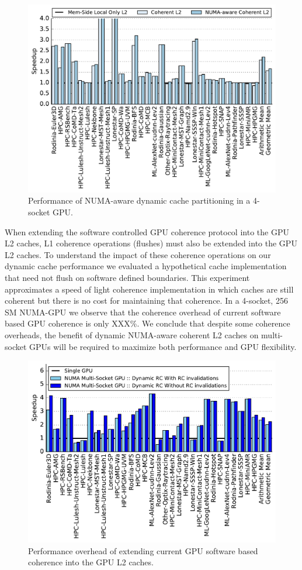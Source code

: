 \begin{figure}[t]
    \centering
    \includegraphics[width=1.0\columnwidth]{figures/plot_dynamic_cache_WB.pdf}
    \caption{Performance of NUMA-aware dynamic cache partitioning in a 4-socket GPU.}
    \label{fig:dynamiccaching}
\end{figure}

 When extending the software controlled GPU coherence protocol into the GPU L2 caches,
L1 coherence operations (flushes) must also be extended into the GPU L2 caches.  To understand
the impact of these coherence operations on our dynamic cache performance we evaluated a hypothetical
cache implementation that need not flush on software defined boundaries.  This experiment
approximates a speed of light coherence implementation in which caches are still coherent but
there is no cost for maintaining that coherence.  In a 4-socket, 256 SM NUMA-GPU we observe
that the coherence overhead of current software based GPU coherence is only XXX\%.  We conclude
that despite some coherence overheads, the benefit of dynamic NUMA-aware coherent L2 caches
on multi-socket GPUs will be required to maximize both performance and GPU flexibility.

\begin{figure}[t]
    \centering
    \includegraphics[width=1.0\columnwidth]{figures/plot_no_inval_WB.pdf}
    \caption{Performance overhead of extending current GPU software based coherence
    into the GPU L2 caches.}
    \label{fig:invalidations}
\end{figure}
